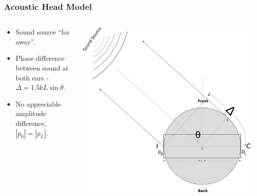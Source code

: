 \documentclass{beamer}
\begin{document}
\begin{frame}[t]
 \frametitle{Acoustic Head Model}
 \begin{columns}
     \begin{column}{.5\textwidth}
    \small
    \flushleft
     
     \begin{itemize}
      \item<2-> Sound source ``far away''.
      \item<2-> Phase difference between sound at both ears - $\Delta=1.5kL\sin\theta$.
      \item<2-> No appreciable amplitude difference, $|p_0|=|p_L|$.
      \end{itemize}

    \end{column}
    
 \begin{column}{0.5\textwidth}
    \includegraphics[width = 6 cm]{Diagrams/Presentation/acousticheadmodel2.png}\\
    \end{column}

    \end{columns}
\end{frame}
\end{document}
